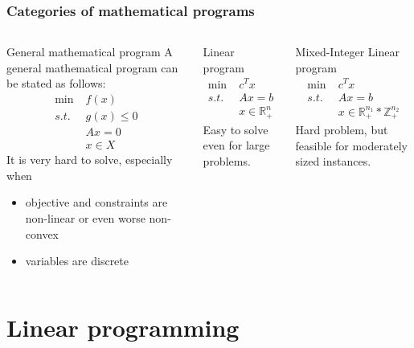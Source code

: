 \begin{frame} \frametitle{Categories of mathematical programs}
\scriptsize
\begin{columns}
	\column{5cm}
	\begin{block}{\footnotesize General mathematical program}
		A general mathematical program can be stated as follows:
		\begin{align*}
			\min \; & f(x) \\
			s.t. \; & g(x) \leq 0 \\
			& Ax = 0 \\
			&x \in X
		\end{align*}
		It is very hard to solve, especially when
		\begin{itemize}
		\item objective and constraints are non-linear or even worse non-convex
		\item variables are discrete
		\end{itemize}
	\end{block}
	\column{8cm}
	\begin{block}{\footnotesize Linear program}
            \vspace{-1\baselineskip}
		\begin{align*}
		\min \; & c^Tx \\
		s.t. \; & Ax = b \\
		&x \in \mathbb{R}^n_+
		\end{align*}
		Easy to solve even for large problems.
	\end{block}
	\begin{block}{\footnotesize Mixed-Integer Linear program}
            \vspace{-1\baselineskip}
            \begin{align*}
		\min \; & c^Tx \\
		s.t. \; & Ax = b \\
		&x \in \mathbb{R}^{n_1}_+*\mathbb{Z}^{n_2}_+
		\end{align*}
		Hard problem, but feasible for moderately sized instances.
	\end{block}
\end{columns}
\end{frame}

\section{Linear programming}


